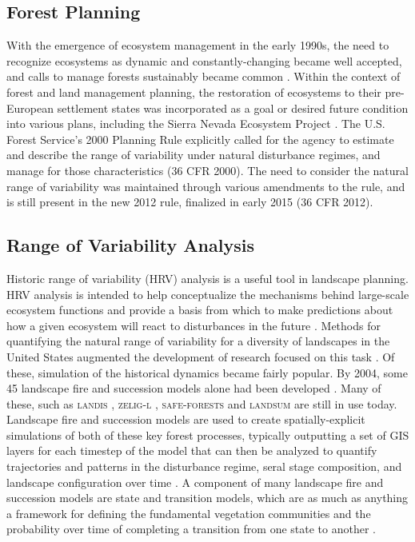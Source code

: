 \subsection{Forest Planning}
With the emergence of ecosystem management in the early 1990s, the need to recognize ecosystems as dynamic and constantly-changing became well accepted, and calls to manage forests sustainably became common \citep{Christensen1996}. Within the context of forest and land management planning, the restoration of ecosystems to their pre-European settlement states was incorporated as a goal or desired future condition into various plans, including the Sierra Nevada Ecosystem Project \cite{SNEP1996a}. The U.S. Forest Service's 2000 Planning Rule explicitly called for the agency to estimate and describe the range of variability under natural disturbance regimes, and manage for those characteristics (36 CFR  2000). The need to consider the natural range of variability was maintained through various amendments to the rule, and is still present in the new 2012 rule, finalized in early 2015 (36 CFR  2012).



\subsection{Range of Variability Analysis}
Historic range of variability (HRV) analysis is a useful tool in landscape planning. HRV analysis is intended to help conceptualize the mechanisms behind large-scale ecosystem functions and provide a basis from which to make predictions about how a given ecosystem will react to disturbances in the future \citep{Nonaka2005,Landres1999}. Methods for quantifying the natural range of variability for a diversity of landscapes in the United States augmented the development of research focused on this task \citep{Landres1999}. Of these, simulation of the historical dynamics became fairly popular. By 2004, some 45 landscape fire and succession models alone had been developed \citep{Keane2004}. Many of these, such as \textsc{landis} \citep{He1999}, \textsc{zelig-l} \citep{Miller1999}, \textsc{safe-forests} \cite{Sessions1997} and \textsc{landsum} \citep{Keane2012} are still in use today. Landscape fire and succession models are used to create spatially-explicit simulations of both of these key forest processes, typically outputting a set of GIS layers for each timestep of the model that can then be analyzed to quantify trajectories and patterns in the disturbance regime, seral stage composition, and landscape configuration over time \citep{Keane2004}. A component of many landscape fire and succession models are state and transition models, which are as much as anything a framework for defining the fundamental vegetation communities and the probability over time of completing a transition from one state to another \citep{Stringham2003,Blankenship2015}.

